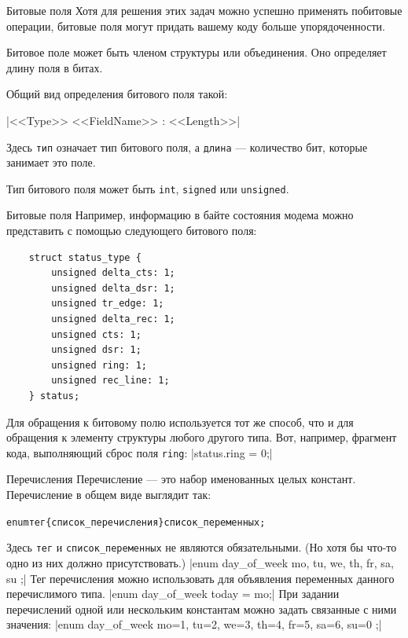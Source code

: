 \documentclass{beamer}
\begin{document}
\begin{frame}[fragile]{Битовые поля}
    Хотя для решения этих задач можно успешно применять побитовые операции, битовые поля могут придать вашему коду больше упорядоченности. 
    
    \medskip
    Битовое поле может быть членом структуры или объединения. Оно определяет длину поля в битах. 
    
    \medskip
    Общий вид определения битового поля такой:
    
    \medskip
    |<<Type>> <<FieldName>> : <<Length>>|
    
    \medskip
    Здесь \texttt{тип} означает тип битового поля, а \texttt{длина} — количество бит, которые занимает это поле. 
    
    \medskip
    Тип битового поля может быть \texttt{int}, \texttt{signed} или \texttt{unsigned}.
\end{frame}

\begin{frame}[fragile]{Битовые поля}
    Например, информацию в байте состояния модема можно представить с
    помощью следующего битового поля:
    
    \begin{verbatim}
    struct status_type {
        unsigned delta_cts: 1;
        unsigned delta_dsr: 1;
        unsigned tr_edge: 1;
        unsigned delta_rec: 1;
        unsigned cts: 1;
        unsigned dsr: 1;
        unsigned ring: 1;
        unsigned rec_line: 1;
    } status;
    \end{verbatim}
    
    Для обращения к битовому полю используется тот же способ, что и для обращения к элементу структуры любого другого типа. Вот, например, фрагмент кода, выполняющий сброс поля \texttt{ring}:
    |status.ring = 0;|
\end{frame}

\begin{frame}{Перечисления}
    Перечисление — это набор именованных целых констант. Перечисление в общем виде выглядит так:
    \medskip
    \begin{alltt}
    enum тег \{список\_перечисления\} список\_переменных;
    \end{alltt}
    \medskip
    Здесь \texttt{тег} и \texttt{список\_переменных} не являются обязательными. (Но хотя бы что-то одно из них должно присутствовать.)
    \medskip
    |enum day_of_week { mo, tu, we, th, fr, sa, su };|
    \medskip
    Тег перечисления можно использовать для объявления переменных
    данного перечислимого типа.
    \medskip
    |enum day_of_week today = mo;|
    \medskip
    При задании перечислений одной или нескольким константам можно
    задать связанные с ними значения:
    \medskip
    |enum day_of_week { mo=1, tu=2, we=3, th=4, fr=5, sa=6, su=0 };|
\end{frame}
\end{document}
